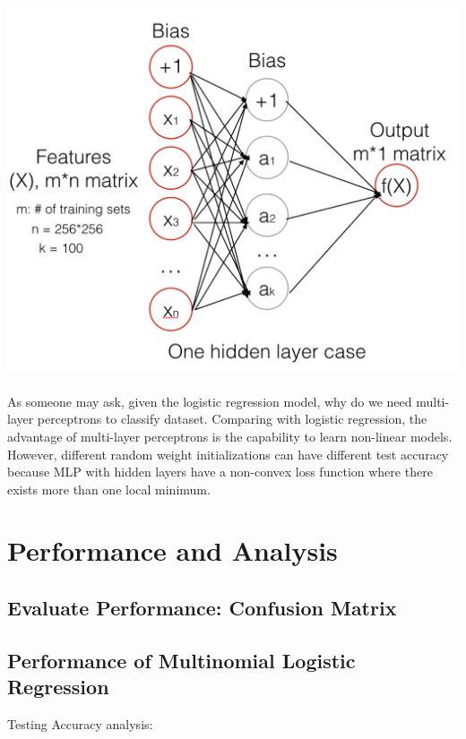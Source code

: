 \documentclass{article}
\begin{document}
\includegraphics[scale=0.5]{2.png}\\

\paragraph{}
As someone may ask, given the logistic regression model, why do we need multi-layer perceptrons to classify dataset. Comparing with logistic regression, the advantage of multi-layer perceptrons is the capability to learn non-linear models. However, different random weight initializations can have different test accuracy because MLP with hidden layers have a non-convex loss function where there exists more than one local minimum. 

\section{Performance and Analysis}
\subsection{Evaluate Performance: Confusion Matrix}
\subsection{Performance of Multinomial Logistic Regression} Testing Accuracy analysis: 
\end{document}
